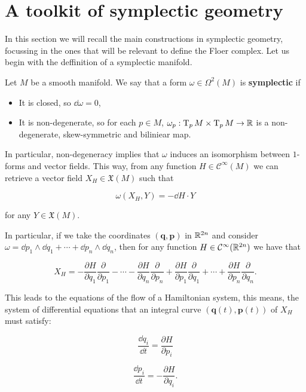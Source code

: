 \section{A toolkit of symplectic geometry}

In this section we will recall the main constructions in symplectic geometry, focussing in the ones that will be relevant to define the Floer complex. Let us begin with the deffinition of a symplectic manifold.

\begin{deff}
Let $M$ be a smooth manifold. We say that a form $\omega \in \Omega^2(M)$ is {\bf symplectic} if

\begin{itemize}
	\item It is closed, so $\dd \omega = 0$,
	\item It is non-degenerate, so for each $p \in M$, $\omega_p : \operatorname T_pM \times \operatorname T_pM \rightarrow \mathbb{R}$ is a non-degenerate, skew-symmetric and biliniear map.
\end{itemize}
\end{deff}

In particular, non-degeneracy implies that $\omega$ induces an isomorphism between $1$-forms and vector fields. This way, from any function $H \in \mathcal{C}^{\infty}(M)$ we can retrieve a vector field $X_H \in \mathfrak{X}(M)$ such that

$$\omega(X_H,Y) = - \dd H \cdot Y$$

for any $Y \in \mathfrak{X}(M)$.

In particular, if we take the coordinates $(\mathbf{q},\mathbf{p})$ in $\mathbb{R}^{2n}$ and consider $\omega = \dd p_1 \wedge \dd q_1 + \cdots + \dd p_n \wedge \dd q_n$, then for any function $H \in \mathcal{C}^{\infty}(\mathbb{R}^{2n})$ we have that

$$X_H = - \frac{\partial H}{\partial q_1} \frac{\partial}{\partial p_1} - \cdots - \frac{\partial H}{\partial q_n} \frac{\partial}{\partial p_n} + \frac{\partial H}{\partial p_1} \frac{\partial}{\partial q_1} + \cdots + \frac{\partial H}{\partial p_n} \frac{\partial}{\partial q_n} .$$

This leads to the equations of the flow of a Hamiltonian system, this means, the system of differential equations that an integral curve $(\mathbf{q}(t),\mathbf{p}(t))$ of $X_H$ must satisfy:

$$\frac{\dd q_i}{\dd t} = \frac{\partial H}{\partial p_i}$$

$$\frac{\dd p_i}{\dd t} = - \frac{\partial H}{\partial q_i} .$$

